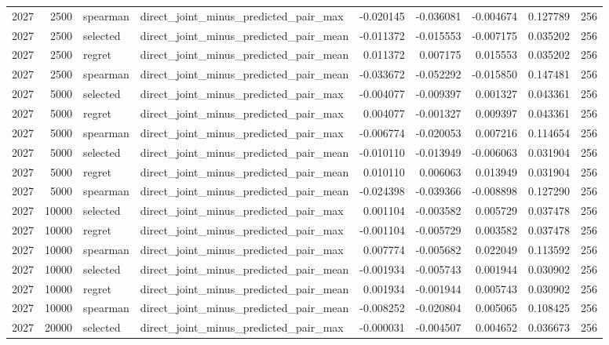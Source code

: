 \begin{tabular}{rrllrrrrr}
2027 & 2500 & spearman & direct_joint_minus_predicted_pair_max & -0.020145 & -0.036081 & -0.004674 & 0.127789 & 256 \\
2027 & 2500 & selected & direct_joint_minus_predicted_pair_mean & -0.011372 & -0.015553 & -0.007175 & 0.035202 & 256 \\
2027 & 2500 & regret & direct_joint_minus_predicted_pair_mean & 0.011372 & 0.007175 & 0.015553 & 0.035202 & 256 \\
2027 & 2500 & spearman & direct_joint_minus_predicted_pair_mean & -0.033672 & -0.052292 & -0.015850 & 0.147481 & 256 \\
2027 & 5000 & selected & direct_joint_minus_predicted_pair_max & -0.004077 & -0.009397 & 0.001327 & 0.043361 & 256 \\
2027 & 5000 & regret & direct_joint_minus_predicted_pair_max & 0.004077 & -0.001327 & 0.009397 & 0.043361 & 256 \\
2027 & 5000 & spearman & direct_joint_minus_predicted_pair_max & -0.006774 & -0.020053 & 0.007216 & 0.114654 & 256 \\
2027 & 5000 & selected & direct_joint_minus_predicted_pair_mean & -0.010110 & -0.013949 & -0.006063 & 0.031904 & 256 \\
2027 & 5000 & regret & direct_joint_minus_predicted_pair_mean & 0.010110 & 0.006063 & 0.013949 & 0.031904 & 256 \\
2027 & 5000 & spearman & direct_joint_minus_predicted_pair_mean & -0.024398 & -0.039366 & -0.008898 & 0.127290 & 256 \\
2027 & 10000 & selected & direct_joint_minus_predicted_pair_max & 0.001104 & -0.003582 & 0.005729 & 0.037478 & 256 \\
2027 & 10000 & regret & direct_joint_minus_predicted_pair_max & -0.001104 & -0.005729 & 0.003582 & 0.037478 & 256 \\
2027 & 10000 & spearman & direct_joint_minus_predicted_pair_max & 0.007774 & -0.005682 & 0.022049 & 0.113592 & 256 \\
2027 & 10000 & selected & direct_joint_minus_predicted_pair_mean & -0.001934 & -0.005743 & 0.001944 & 0.030902 & 256 \\
2027 & 10000 & regret & direct_joint_minus_predicted_pair_mean & 0.001934 & -0.001944 & 0.005743 & 0.030902 & 256 \\
2027 & 10000 & spearman & direct_joint_minus_predicted_pair_mean & -0.008252 & -0.020804 & 0.005065 & 0.108425 & 256 \\
2027 & 20000 & selected & direct_joint_minus_predicted_pair_max & -0.000031 & -0.004507 & 0.004652 & 0.036673 & 256 \\

\end{tabular}
